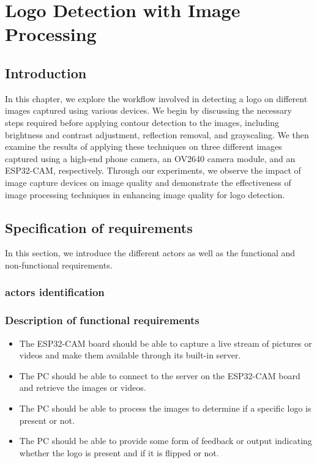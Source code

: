 %
%


\chapter{Logo Detection with Image Processing}

\section{Introduction}
In this chapter, we explore the workflow involved in detecting a logo on different images captured using various devices. We begin by discussing the necessary steps required before applying contour detection to the images, including brightness and contrast adjustment, reflection removal, and grayscaling. We then examine the results of applying these techniques on three different images captured using a high-end phone camera, an OV2640 camera module, and an ESP32-CAM, respectively. Through our experiments, we observe the impact of image capture devices on image quality and demonstrate the effectiveness of image processing techniques in enhancing image quality for logo detection.
\section{Specification of requirements}
In this section, we introduce the different actors as well as the functional and non-functional requirements.
\subsection{actors identification }
\subsection{Description of functional requirements}
\begin{itemize}
\item The ESP32-CAM board should be able to capture a live stream of pictures or videos and make them available through its built-in server.
\item The PC should be able to connect to the server on the ESP32-CAM board and retrieve the images or videos.
\item The PC should be able to process the images to determine if a specific logo is present or not.
\item The PC should be able to provide some form of feedback or output indicating whether the logo is present and if it is flipped or not.
\end{itemize}
